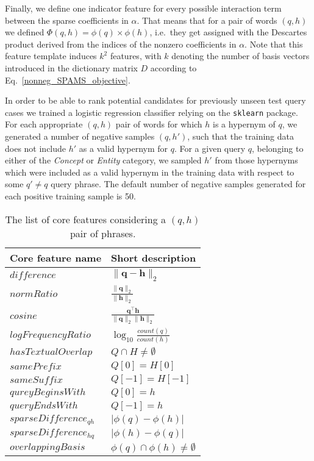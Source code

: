 \documentclass[11pt,a4paper]{article}
\begin{document}
Finally, we define one indicator feature for every possible interaction term between the sparse coefficients in $\alpha$. That means that for a pair of words $(q, h)$ we defined $\Phi(q,h)=\phi(q) \times \phi(h)$, i.e.~they get assigned with the Descartes product derived from the indices of the nonzero coefficients in $\alpha$. Note that this feature template induces $k^2$ features, with $k$ denoting the number of basis vectors introduced in the dictionary matrix $D$ according to Eq.~\ref{nonneg_SPAMS_objective}.

In order to be able to rank potential candidates for previously unseen test query cases we trained a logistic regression classifier relying on the \texttt{sklearn} package. For each appropriate $(q,h)$ pair of words for which $h$ is a hypernym of $q$, we generated a number of negative samples $(q, h')$, such that the training data does not include $h'$ as a valid hypernym for $q$. For a given query $q$, belonging to either of the \textit{Concept} or \textit{Entity} category, we sampled $h'$ from those hypernyms which were included as a valid hypernym in the training data with respect to some $q' \neq q$ query phrase. The default number of negative samples generated for each positive training sample is 50. %

\begin{table}
	\begin{tabular}{ll}
		Core feature name   & Short description \\  \hline
		$difference$        & $\lVert \mathbf{q} - \mathbf{h} \rVert_2$ \\
		$normRatio$         & $\frac{\lVert \mathbf{q}\rVert_2}{\lVert \mathbf{h} \rVert_2}$ \\
		$cosine$            & $\frac{\mathbf{q}^\intercal \mathbf{h}}{\lVert \mathbf{q} \rVert_2\lVert \mathbf{h} \rVert_2}$ \\
		$logFrequencyRatio$ & $\log_{10}\frac{count(q)}{count(h)}$ \\
		$hasTextualOverlap$ & $Q \cap H \neq \emptyset$ \\
		$samePrefix$        & $Q[0] = H[0]$ \\
		$sameSuffix$        & $Q[-1] = H[-1]$ \\
		$qureyBeginsWith$   & $Q[0] = h$ \\
		$queryEndsWith$     & $Q[-1] = h$ \\
		$sparseDifference_{qh}$ & $\lvert \phi(q) - \phi(h) \rvert$ \\
		$sparseDifference_{hq}$ & $\lvert \phi(h) - \phi(q) \rvert$ \\
		$overlappingBasis$  & $\phi(q) \cap \phi(h) \neq \emptyset$ \\
	\end{tabular}
	\caption{The list of core features considering a $(q,h)$ pair of phrases.}
	\label{table:core_features}
\end{table}
\end{document}
